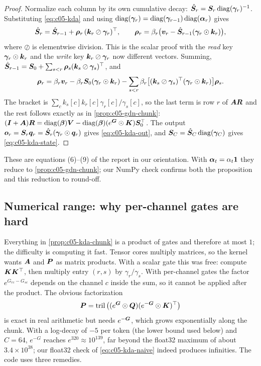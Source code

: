 \begin{proof}
Normalize each column by its own cumulative decay: $\hat{\bm{S}}_r = \bm{S}_r\operatorname{diag}(\bm\gamma_r)^{-1}$.
Substituting \cref{eq:c05-kda} and using $\operatorname{diag}(\bm\gamma_r) = \operatorname{diag}(\bm\gamma_{r-1})\operatorname{diag}(\bm{\alpha}_r)$
gives
\[
  \hat{\bm{S}}_r = \hat{\bm{S}}_{r-1} + \bm\rho_r\,(\bm{k}_r\oslash\bm\gamma_r)^{\top},\qquad
  \bm\rho_r = \beta_r\big(\bm{v}_r - \hat{\bm{S}}_{r-1}(\bm\gamma_r\odot\bm{k}_r)\big),
\]
where $\oslash$ is elementwise division. This is the scalar proof with the \emph{read} key
$\bm\gamma_r\odot\bm{k}_r$ and the \emph{write} key $\bm{k}_r\oslash\bm\gamma_r$ now different vectors.
Summing, $\hat{\bm{S}}_{r-1} = \bm{S}_0 + \sum_{s<r}\bm\rho_s(\bm{k}_s\oslash\bm\gamma_s)^{\top}$, and
\[
  \bm\rho_r = \beta_r\bm{v}_r - \beta_r\bm{S}_0(\bm\gamma_r\odot\bm{k}_r)
     - \sum_{s<r}\beta_r\big[(\bm{k}_s\oslash\bm\gamma_s)^{\top}(\bm\gamma_r\odot\bm{k}_r)\big]\bm\rho_s .
\]
The bracket is $\sum_c k_s[c]k_r[c]\gamma_r[c]/\gamma_s[c]$, so the last term is row $r$ of
$\bm{A}\bm R$ and the rest follows exactly as in \cref{prop:c05-gdn-chunk}:
$(\bm{I}+\bm{A})\bm R = \operatorname{diag}(\bm{\beta})\bm{V} - \operatorname{diag}(\bm{\beta})(e^{\bm{G}}\odot\bm{K})\bm{S}_0^{\top}$. The output
$\bm{o}_r = \bm{S}_r\bm{q}_r = \hat{\bm{S}}_r(\bm\gamma_r\odot\bm{q}_r)$ gives \cref{eq:c05-kda-out}, and
$\bm{S}_C = \hat{\bm{S}}_C\operatorname{diag}(\bm\gamma_C)$ gives \cref{eq:c05-kda-state}.
\end{proof}

These are equations (6)--(9) of the report in our orientation. With $\bm{\alpha}_t = \alpha_t\mathbf 1$
they reduce to \cref{prop:c05-gdn-chunk}; our NumPy check confirms both the proposition and this
reduction to round-off.

\subsection{Numerical range: why per-channel gates are hard}\label{sec:c05-kda-range}

Everything in \cref{prop:c05-kda-chunk} is a product of gates and therefore at most $1$; the
difficulty is computing it fast. Tensor cores multiply matrices, so the kernel wants $\bm{A}$ and $\bm{P}$
as matrix products. With a scalar gate this was free: compute $\bm{K}\bm{K}^{\top}$, then multiply entry
$(r,s)$ by $\gamma_r/\gamma_s$. With per-channel gates the factor $e^{G_{rc}-G_{sc}}$ depends on the
channel $c$ inside the sum, so it cannot be applied after the product. The obvious factorization
\begin{equation}\label{eq:c05-kda-naive}
  \bm{P} = \operatorname{tril}\big((e^{\bm{G}}\odot\bm{Q})(e^{-\bm{G}}\odot\bm{K})^{\top}\big)
\end{equation}
is exact in real arithmetic but needs $e^{-\bm{G}}$, which grows exponentially along the chunk. With a
log-decay of $-5$ per token (the lower bound used below) and $C = 64$, $e^{-G}$ reaches
$e^{320} \approx 10^{139}$, far beyond the float32 maximum of about $3.4\times10^{38}$; our float32
check of \cref{eq:c05-kda-naive} indeed produces infinities. The code uses three remedies.

